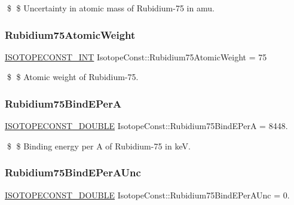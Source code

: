 \$ \$ Uncertainty in atomic mass of Rubidium-\/75 in amu. \mbox{\label{group___isotope_const-_rubidium-_rb75_ga2136e475671f733bd293616e4f1f0069}} 
\subsubsection{\texorpdfstring{Rubidium75\+Atomic\+Weight}{Rubidium75AtomicWeight}}
{\footnotesize\ttfamily \mbox{\hyperlink{group___isotope_const-_macros_ga5f18360b3e99483a35c32d789e62621c}{I\+S\+O\+T\+O\+P\+E\+C\+O\+N\+S\+T\+\_\+\+I\+NT}} Isotope\+Const\+::\+Rubidium75\+Atomic\+Weight = 75}

\$ \$ Atomic weight of Rubidium-\/75. \mbox{\label{group___isotope_const-_rubidium-_rb75_ga40947edea72f79487f3991cee13cb61a}} 
\subsubsection{\texorpdfstring{Rubidium75\+Bind\+E\+PerA}{Rubidium75BindEPerA}}
{\footnotesize\ttfamily \mbox{\hyperlink{group___isotope_const-_macros_ga8f45a7272ce02c0b4c65c44636ed719a}{I\+S\+O\+T\+O\+P\+E\+C\+O\+N\+S\+T\+\_\+\+D\+O\+U\+B\+LE}} Isotope\+Const\+::\+Rubidium75\+Bind\+E\+PerA = 8448.}

\$ \$ Binding energy per A of Rubidium-\/75 in keV. \mbox{\label{group___isotope_const-_rubidium-_rb75_ga484916cd32dd8b252e682e7076b0d44d}} 
\subsubsection{\texorpdfstring{Rubidium75\+Bind\+E\+Per\+A\+Unc}{Rubidium75BindEPerAUnc}}
{\footnotesize\ttfamily \mbox{\hyperlink{group___isotope_const-_macros_ga8f45a7272ce02c0b4c65c44636ed719a}{I\+S\+O\+T\+O\+P\+E\+C\+O\+N\+S\+T\+\_\+\+D\+O\+U\+B\+LE}} Isotope\+Const\+::\+Rubidium75\+Bind\+E\+Per\+A\+Unc = 0.}

